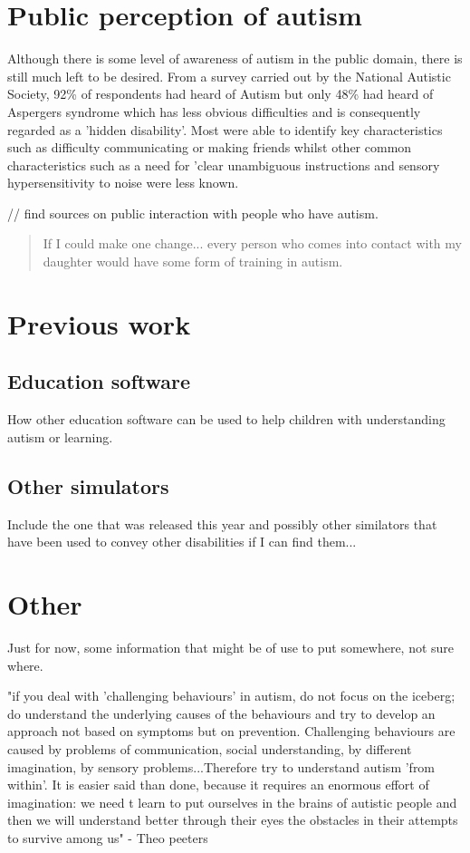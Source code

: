 \documentclass[11pt]{report}
\begin{document}
\section{Public perception of autism}
Although there is some level of awareness of autism in the public domain, there is still much left to be desired.  From a survey carried out by the National Autistic Society, 92\% of respondents had heard of Autism but only 48\% had heard of Aspergers syndrome which has less obvious difficulties and is consequently regarded as a 'hidden disability'. Most were able to identify key characteristics such as difficulty communicating or making friends whilst other common characteristics such as a need for 'clear unambiguous instructions and sensory hypersensitivity to noise were less known\cite{autismmisconception}. 

// find sources on public interaction with people who have autism.

\begin{quote}
If I could make one change... every person who comes into contact with my daughter would have some form of training in autism.\cite{nasschool}
\end{quote}


\section{Previous work}

\subsection{Education software}
How other education software can be used to help children with understanding autism or learning. 

\subsection{Other simulators}
Include the one that was released this year and possibly other similators that have been used to convey other disabilities if I can find them...

\section{Other}
Just for now, some information that might be of use to put somewhere, not sure where.

"if you deal with 'challenging behaviours' in autism, do not focus on the iceberg; do understand the underlying causes of the behaviours and try to develop an approach not based on symptoms but on prevention. Challenging behaviours are caused by problems of communication, social understanding, by different imagination, by sensory problems...Therefore try to understand autism 'from within'. It is easier said than done, because it requires an enormous effort of imagination: we need t learn to put ourselves in the brains of autistic people and then we will understand better through their eyes the obstacles in their attempts to survive among us" - Theo peeters \cite{olgab}
\end{document}
